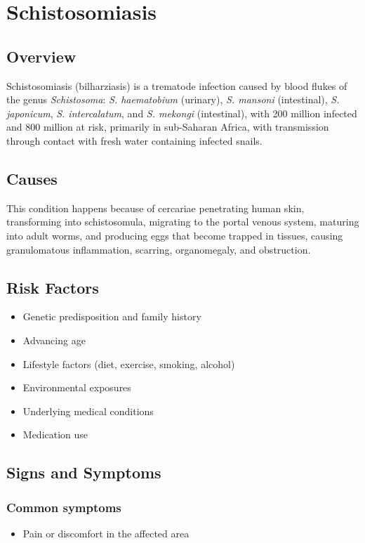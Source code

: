 \chapter{Schistosomiasis}
\label{sec:Schistosomiasis}

\section{Overview}
Schistosomiasis (bilharziasis) is a trematode infection caused by blood flukes of the genus \textit{Schistosoma}: \textit{S. haematobium} (urinary), \textit{S. mansoni} (intestinal), \textit{S. japonicum}, \textit{S. intercalatum}, and \textit{S. mekongi} (intestinal), with 200 million infected and 800 million at risk, primarily in sub-Saharan Africa, with transmission through contact with fresh water containing infected snails.
\section{Causes}
This condition happens because of cercariae penetrating human skin, transforming into schistosomula, migrating to the portal venous system, maturing into adult worms, and producing eggs that become trapped in tissues, causing granulomatous inflammation, scarring, organomegaly, and obstruction.     
\section{Risk Factors}

\begin{itemize}[noitemsep]
  \item Genetic predisposition and family history
  \item Advancing age
  \item Lifestyle factors (diet, exercise, smoking, alcohol)
  \item Environmental exposures
  \item Underlying medical conditions
  \item Medication use
\end{itemize}
\section{Signs and Symptoms}

\subsection{Common symptoms}
\begin{itemize}[noitemsep]
  \item Pain or discomfort in the affected area
  \end{itemize}

